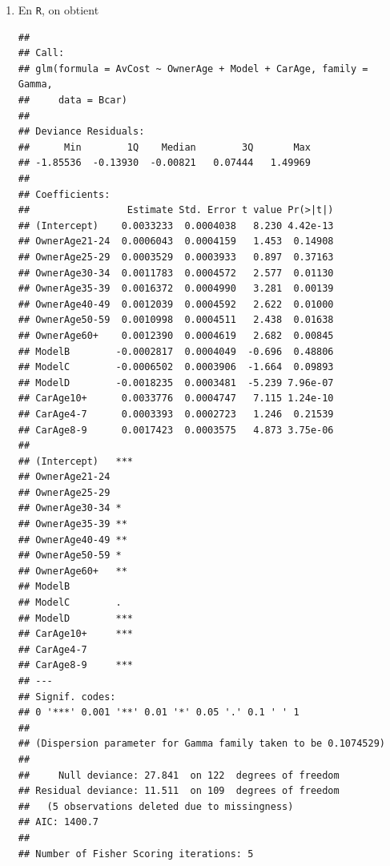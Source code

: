 \begin{solution}{2.8}
\begin{enumerate}
\item En \texttt{R}, on obtient
\begin{knitrout}
\color{fgcolor}\begin{kframe}
\begin{alltt}
 \hlkwb{<-} \hlopt{~}\hlopt{+}\hlopt{+}
\end{alltt}
\begin{verbatim}
##
## Call:
## glm(formula = AvCost ~ OwnerAge + Model + CarAge, family = Gamma,
##     data = Bcar)
##
## Deviance Residuals:
##      Min        1Q    Median        3Q       Max
## -1.85536  -0.13930  -0.00821   0.07444   1.49969
##
## Coefficients:
##                 Estimate Std. Error t value Pr(>|t|)
## (Intercept)    0.0033233  0.0004038   8.230 4.42e-13
## OwnerAge21-24  0.0006043  0.0004159   1.453  0.14908
## OwnerAge25-29  0.0003529  0.0003933   0.897  0.37163
## OwnerAge30-34  0.0011783  0.0004572   2.577  0.01130
## OwnerAge35-39  0.0016372  0.0004990   3.281  0.00139
## OwnerAge40-49  0.0012039  0.0004592   2.622  0.01000
## OwnerAge50-59  0.0010998  0.0004511   2.438  0.01638
## OwnerAge60+    0.0012390  0.0004619   2.682  0.00845
## ModelB        -0.0002817  0.0004049  -0.696  0.48806
## ModelC        -0.0006502  0.0003906  -1.664  0.09893
## ModelD        -0.0018235  0.0003481  -5.239 7.96e-07
## CarAge10+      0.0033776  0.0004747   7.115 1.24e-10
## CarAge4-7      0.0003393  0.0002723   1.246  0.21539
## CarAge8-9      0.0017423  0.0003575   4.873 3.75e-06
##
## (Intercept)   ***
## OwnerAge21-24
## OwnerAge25-29
## OwnerAge30-34 *
## OwnerAge35-39 **
## OwnerAge40-49 **
## OwnerAge50-59 *
## OwnerAge60+   **
## ModelB
## ModelC        .
## ModelD        ***
## CarAge10+     ***
## CarAge4-7
## CarAge8-9     ***
## ---
## Signif. codes:
## 0 '***' 0.001 '**' 0.01 '*' 0.05 '.' 0.1 ' ' 1
##
## (Dispersion parameter for Gamma family taken to be 0.1074529)
##
##     Null deviance: 27.841  on 122  degrees of freedom
## Residual deviance: 11.511  on 109  degrees of freedom
##   (5 observations deleted due to missingness)
## AIC: 1400.7
##
## Number of Fisher Scoring iterations: 5
\end{verbatim}
\end{kframe}
\end{knitrout}


\end{enumerate}
\end{solution}
